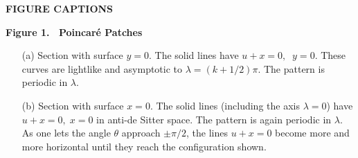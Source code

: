 \documentclass[12pt]{article}
\newcounter{c1} \newcounter{c2}
\begin{document}


\newpage

\centerline{\bf FIGURE CAPTIONS}

\bigskip
\noindent
{\bf Figure 1. \ Poincar\'e Patches}
\begin{enumerate}
\item[(a)] Section with surface $y=0$. The solid lines have $u+x=0,\;\; y=0$.
These
 curves are lightlike and asymptotic to $\lambda = (k+1/2)\pi$. The pattern is
 periodic in $\lambda$.

\item[(b)] Section with surface $x=0$. The solid lines (including the axis
$\lambda
 =0$) have  $u+x =0,\; x=0$ in anti-de Sitter space. The pattern
is again periodic in $\lambda$. As one lets the angle  $\theta$ approach
$\pm \pi/2$, the lines $u+x=0$ become more and more horizontal until they
reach the configuration shown.
\end{enumerate}
\bigskip
\end{document}
